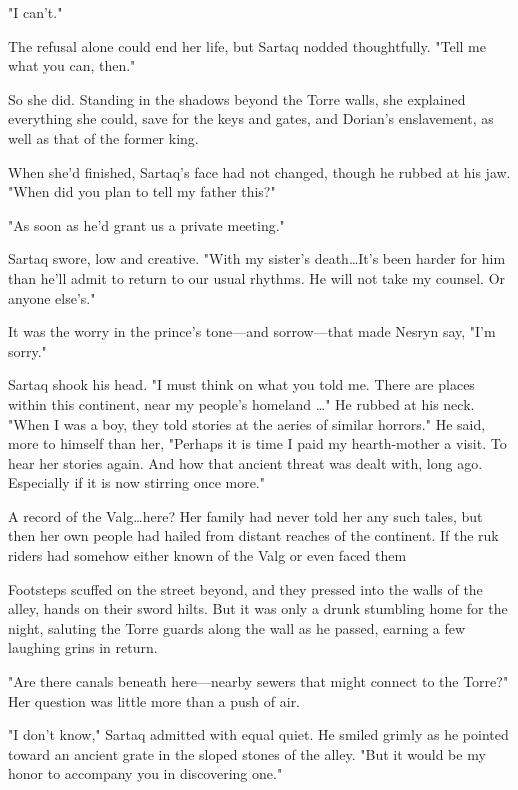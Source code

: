 "I can't."

The refusal alone could end her life, but Sartaq nodded thoughtfully.
"Tell me what you can, then."

So she did.
Standing in the shadows beyond the Torre walls, she explained everything she could, save for the keys and gates, and Dorian's enslavement, as well as that of the former king.

When she'd finished, Sartaq's face had not changed, though he rubbed at his jaw.
"When did you plan to tell my father this?"

"As soon as he'd grant us a private meeting."

Sartaq swore, low and creative.
"With my sister's death\ldots It's been harder for him than he'll admit to return to our usual rhythms.
He will not take my counsel.
Or anyone else's."

It was the worry in the prince's tone---and sorrow---that made Nesryn say, "I'm sorry."

Sartaq shook his head.
"I must think on what you told me.
There are places within this continent, near my people's homeland \ldots" He rubbed at his neck.
"When I was a boy, they told stories at the aeries of similar horrors."
He said, more to himself than her, "Perhaps it is time I paid my hearth-mother a visit.
To hear her stories again.
And how that ancient threat was dealt with, long ago.
Especially if it is now stirring once more."

A record of the Valg\ldots here?
Her family had never told her any such tales, but then her own people had hailed from distant reaches of the continent.
If the ruk riders had somehow either known of the Valg or even faced them 

Footsteps scuffed on the street beyond, and they pressed into the walls of the alley, hands on their sword hilts.
But it was only a drunk stumbling home for the night, saluting the Torre guards along the wall as he passed, earning a few laughing grins in return.

"Are there canals beneath here---nearby sewers that might connect to the Torre?"
Her question was little more than a push of air.

"I don't know," Sartaq admitted with equal quiet.
He smiled grimly as he pointed toward an ancient grate in the sloped stones of the alley.
"But it would be my honor to accompany you in discovering one."

